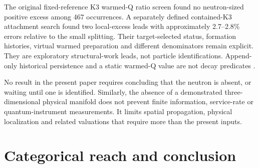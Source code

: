 \documentclass[11pt,a4paper]{article}
\begin{document}
The original fixed-reference K3 warmed-Q ratio screen found no neutron-sized positive excess among 467 occurrences. A separately defined contained-K3 attachment search found two local-excess leads with approximately 2.7--2.8\% errors relative to the small splitting. Their target-selected status, formation histories, virtual warmed preparation and different denominators remain explicit. They are exploratory structural-work leads, not particle identifications. Append-only historical persistence and a static warmed-Q value are not decay predicates \cite{N1,N2}.

No result in the present paper requires concluding that the neutron is absent, or waiting until one is identified. Similarly, the absence of a demonstrated three-dimensional physical manifold does not prevent finite information, service-rate or quantum-instrument measurements. It limits spatial propagation, physical localization and related valuations that require more than the present inputs.

\section{Categorical reach and conclusion}\label{categorical-reach-and-conclusion}
\end{document}

